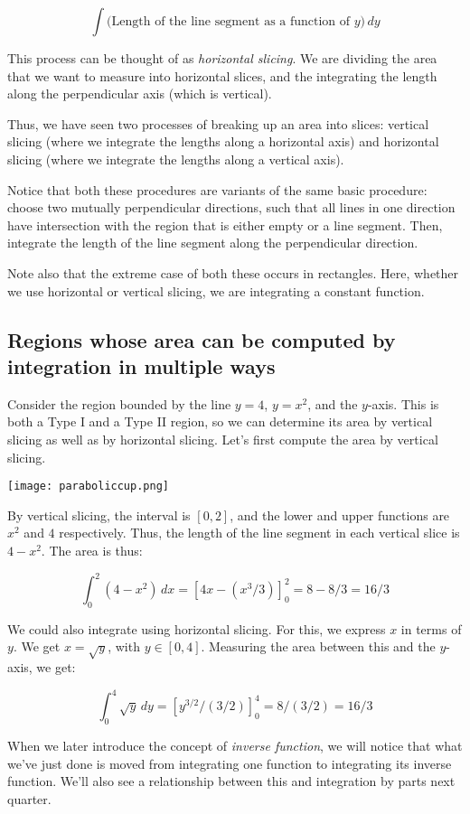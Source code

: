 \documentclass[10pt]{amsart}
\begin{document}
$$ \int \text{(Length of the line segment as a function of $y$)} \, dy$$

This process can be thought of as {\em horizontal slicing}. We are
dividing the area that we want to measure into horizontal slices, and
the integrating the length along the perpendicular axis (which is
vertical).

Thus, we have seen two processes of breaking up an area into slices:
vertical slicing (where we integrate the lengths along a horizontal
axis) and horizontal slicing (where we integrate the lengths along a
vertical axis).

Notice that both these procedures are variants of the same basic
procedure: choose two mutually perpendicular directions, such that all
lines in one direction have intersection with the region that is
either empty or a line segment. Then, integrate the length of the line
segment along the perpendicular direction.

Note also that the extreme case of both these occurs in
rectangles. Here, whether we use horizontal or vertical slicing, we
are integrating a constant function.

\subsection{Regions whose area can be computed by integration in multiple ways}

Consider the region bounded by the line $y = 4$, $y = x^2$, and the
$y$-axis. This is both a Type I and a Type II region, so we can
determine its area by vertical slicing as well as by horizontal
slicing. Let's first compute the area by vertical slicing.

\texttt{[image: paraboliccup.png]}

By vertical slicing, the interval is $[0,2]$, and the lower and upper
functions are $x^2$ and $4$ respectively. Thus, the length of the line
segment in each vertical slice is $4 - x^2$. The area is thus:

$$\int_0^2 (4 - x^2) \, dx = [4x - (x^3/3)]_0^2 = 8 - 8/3 = 16/3$$

We could also integrate using horizontal slicing. For this, we express
$x$ in terms of $y$. We get $x = \sqrt{y}$, with $y \in
[0,4]$. Measuring the area between this and the $y$-axis, we get:

$$\int_0^4 \sqrt{y} \, dy = [y^{3/2}/(3/2)]_0^4 = 8/(3/2) = 16/3$$

When we later introduce the concept of {\em inverse function}, we will
notice that what we've just done is moved from integrating one
function to integrating its inverse function. We'll also see a
relationship between this and integration by parts next quarter.
\end{document}
